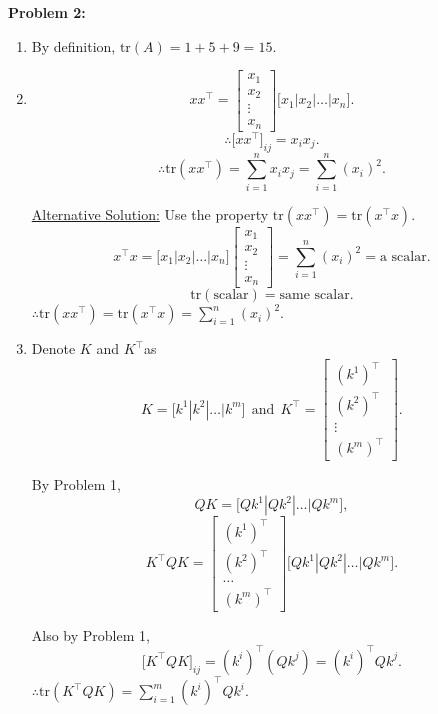 \documentclass[letterpaper]{article}
\begin{document}
\bigskip
\noindent \textbf{Problem 2:}

\begin{enumerate}
\setlength{\itemsep}{.1in}
\renewcommand{\labelenumi}{(\alph{enumi})}
\item By definition, $\mathrm{tr}(A)=1+5+9=15.$

\item $$x x^\top=\begin{bmatrix}  x_1\\ x_2 \\ \vdots \\ x_n\end{bmatrix} \big[ x_1|x_2| \ldots | x_n \big].$$
$$\therefore \big[x x^\top \big]_{ij}=x_i x_j.$$
$$\therefore \mathrm{tr}(x x^\top)=\sum \limits_{i=1}^{n} x_i x_j = \sum \limits_{i=1}^{n} (x_i)^2.$$

\underline{Alternative Solution:} Use the property $\mathrm{tr}(x x^\top)=\mathrm{tr}(x^\top x).$
$$x^\top x=\big[ x_1|x_2| \ldots | x_n \big]\begin{bmatrix}  x_1\\ x_2 \\ \vdots \\ x_n\end{bmatrix}= \sum \limits_{i=1}^{n} (x_i)^2=\text{a scalar}.$$
$$\mathrm{tr}(\text{scalar})= \text{same scalar}.$$
$\therefore\mathrm{tr}(x x^\top)=\mathrm{tr}(x^\top x)= \sum \limits_{i=1}^{n} (x_i)^2.$

\item Denote $K$ and $K^\top$as
$$K=\big[k^1|k^2| \ldots |k^m\big] ~~\text{and}~~ K^\top=\begin{bmatrix} (k^1)^\top \\ (k^2)^\top \\ \vdots \\(k^m)^\top\end{bmatrix}.$$

By Problem 1,
$$QK=\big[Qk^1|Qk^2| \ldots |Qk^m\big],$$
$$K^\top QK = \begin{bmatrix} (k^1)^\top \\ (k^2)^\top \\ \ldots \\ (k^m)^\top\end{bmatrix}\big[Qk^1|Qk^2| \ldots |Qk^m\big].$$

Also by Problem 1,
$$\big[K^\top QK \big]_{ij}=(k^i)^\top(Qk^j)=(k^i)^\top Qk^j.$$
$\therefore\mathrm{tr}(K^\top QK)=\sum \limits_{i=1}^{m}(k^i)^\top Qk^i.$

\end{enumerate}
\bigskip
\end{document}
